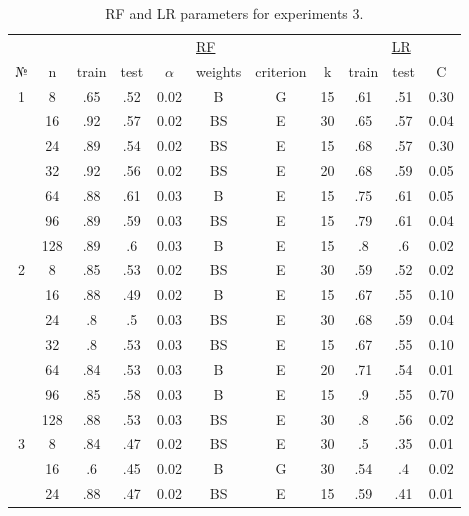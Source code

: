 \begin{table}
\centering
\caption{RF and LR parameters for experiments 3.}
\label{tab:params_3_rf_lr}
\begin{tabular}{|c|c|cccccc||ccc|}\hline
& & \multicolumn{6}{c||}{\underline{RF}} & \multicolumn{3}{c|}{\underline{LR}}\\
№ &   n & train & test & $\alpha$ & weights & criterion &  k & train & test &    C \\\hline
1 &   8 &   .65 &  .52 &     0.02 &       B &         G & 15 &   .61 &  .51 & 0.30 \\
  &  16 &   .92 &  .57 &     0.02 &      BS &         E & 30 &   .65 &  .57 & 0.04 \\
  &  24 &   .89 &  .54 &     0.02 &      BS &         E & 15 &   .68 &  .57 & 0.30 \\
  &  32 &   .92 &  .56 &     0.02 &      BS &         E & 20 &   .68 &  .59 & 0.05 \\
  &  64 &   .88 &  .61 &     0.03 &       B &         E & 15 &   .75 &  .61 & 0.05 \\
  &  96 &   .89 &  .59 &     0.03 &      BS &         E & 15 &   .79 &  .61 & 0.04 \\
  & 128 &   .89 &   .6 &     0.03 &       B &         E & 15 &    .8 &   .6 & 0.02 \\\hline
2 &   8 &   .85 &  .53 &     0.02 &      BS &         E & 30 &   .59 &  .52 & 0.02 \\
  &  16 &   .88 &  .49 &     0.02 &       B &         E & 15 &   .67 &  .55 & 0.10 \\
  &  24 &    .8 &   .5 &     0.03 &      BS &         E & 30 &   .68 &  .59 & 0.04 \\
  &  32 &    .8 &  .53 &     0.03 &      BS &         E & 15 &   .67 &  .55 & 0.10 \\
  &  64 &   .84 &  .53 &     0.03 &       B &         E & 20 &   .71 &  .54 & 0.01 \\
  &  96 &   .85 &  .58 &     0.03 &       B &         E & 15 &    .9 &  .55 & 0.70 \\
  & 128 &   .88 &  .53 &     0.03 &      BS &         E & 30 &    .8 &  .56 & 0.02 \\\hline
3 &   8 &   .84 &  .47 &     0.02 &      BS &         E & 30 &    .5 &  .35 & 0.01 \\
  &  16 &    .6 &  .45 &     0.02 &       B &         G & 30 &   .54 &   .4 & 0.02 \\
  &  24 &   .88 &  .47 &     0.02 &      BS &         E & 15 &   .59 &  .41 & 0.01 \\

\end{tabular}
\end{table}
